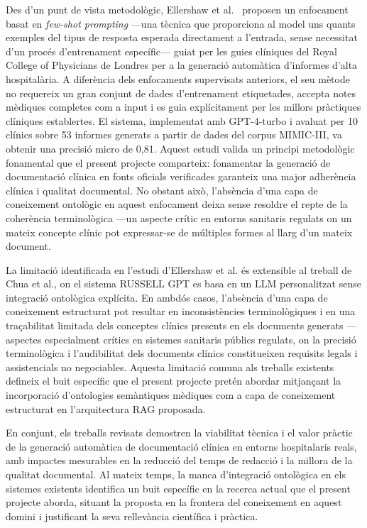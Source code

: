 \documentclass[CAT]{TFUOC}%
\begin{document}
Des d'un punt de vista metodològic, Ellershaw et al.~\cite{ellershaw2024discharge} proposen un enfocament basat en \textit{few-shot prompting} ---una tècnica que proporciona al model uns quants exemples del tipus de resposta esperada directament a l'entrada, sense necessitat d'un procés d'entrenament específic--- guiat per les guies clíniques del Royal College of Physicians de Londres per a la generació automàtica d'informes d'alta hospitalària. A diferència dels enfocaments supervisats anteriors, el seu mètode no requereix un gran conjunt de dades d'entrenament etiquetades, accepta notes mèdiques completes com a input i es guia explícitament per les millors pràctiques clíniques establertes. El sistema, implementat amb GPT-4-turbo i avaluat per 10 clínics sobre 53 informes generats a partir de dades del corpus MIMIC-III, va obtenir una precisió micro de 0,81. Aquest estudi valida un principi metodològic fonamental que el present projecte comparteix: fonamentar la generació de documentació clínica en fonts oficials verificades garanteix una major adherència clínica i qualitat documental. No obstant això, l'absència d'una capa de coneixement ontològic en aquest enfocament deixa sense resoldre el repte de la coherència terminològica ---un aspecte crític en entorns sanitaris regulats on un mateix concepte clínic pot expressar-se de múltiples formes al llarg d'un mateix document.

La limitació identificada en l'estudi d'Ellershaw et al. és extensible al treball de Chua et al., on el sistema RUSSELL GPT es basa en un LLM personalitzat sense integració ontològica explícita. En ambdós casos, l'absència d'una capa de coneixement estructurat pot resultar en inconsistències terminològiques i en una traçabilitat limitada dels conceptes clínics presents en els documents generats ---aspectes especialment crítics en sistemes sanitaris públics regulats, on la precisió terminològica i l'audibilitat dels documents clínics constitueixen requisits legals i assistencials no negociables. Aquesta limitació comuna als treballs existents defineix el buit específic que el present projecte pretén abordar mitjançant la incorporació d'ontologies semàntiques mèdiques com a capa de coneixement estructurat en l'arquitectura RAG proposada.

En conjunt, els treballs revisats demostren la viabilitat tècnica i el valor pràctic de la generació automàtica de documentació clínica en entorns hospitalaris reals, amb impactes mesurables en la reducció del temps de redacció i la millora de la qualitat documental. Al mateix temps, la manca d'integració ontològica en els sistemes existents identifica un buit específic en la recerca actual que el present projecte aborda, situant la proposta en la frontera del coneixement en aquest domini i justificant la seva rellevància científica i pràctica.
\end{document}
